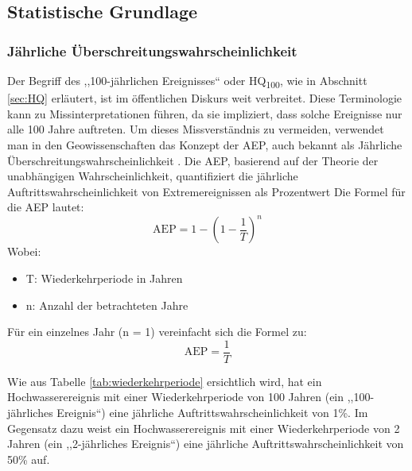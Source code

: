 \subsection{Statistische Grundlage}
\subsubsection{Jährliche Überschreitungswahrscheinlichkeit}
Der Begriff des  ,,100-jährlichen Ereignisses`` oder HQ\textsubscript{100}, wie in Abschnitt \ref{sec:HQ} erläutert, ist im öffentlichen Diskurs weit verbreitet. Diese Terminologie kann zu Missinterpretationen führen, da sie impliziert, dass solche Ereignisse nur alle 100 Jahre auftreten. Um dieses Missverständnis zu vermeiden, verwendet man in den Geowissenschaften das Konzept der \ac{AEP}, auch bekannt als Jährliche Überschreitungswahrscheinlichkeit \parencite{uswrc1981} .
Die \ac{AEP}, basierend auf der Theorie der unabhängigen Wahrscheinlichkeit, quantifiziert die jährliche Auftrittswahrscheinlichkeit von Extremereignissen als Prozentwert
Die Formel für die AEP lautet:
\begin{equation*}
    \text{AEP} = 1 - \left(1 - \frac{1}{T}\right)^n
    \end{equation*}
Wobei:
\begin{itemize}
\item T: Wiederkehrperiode in Jahren
\item n: Anzahl der betrachteten Jahre
\end{itemize}
Für ein einzelnes Jahr (n = 1) vereinfacht sich die Formel zu:
\begin{equation}
\text{AEP} = \frac{1}{T}
\end{equation}

Wie aus Tabelle \ref{tab:wiederkehrperiode} ersichtlich wird, hat ein Hochwasserereignis mit einer Wiederkehrperiode von 100 Jahren (ein ,,100-jährliches Ereignis``) eine jährliche Auftrittswahrscheinlichkeit von 1\%. Im Gegensatz dazu weist ein Hochwasserereignis mit einer Wiederkehrperiode von 2 Jahren (ein ,,2-jährliches Ereignis``) eine jährliche Auftrittswahrscheinlichkeit von 50\% auf.

